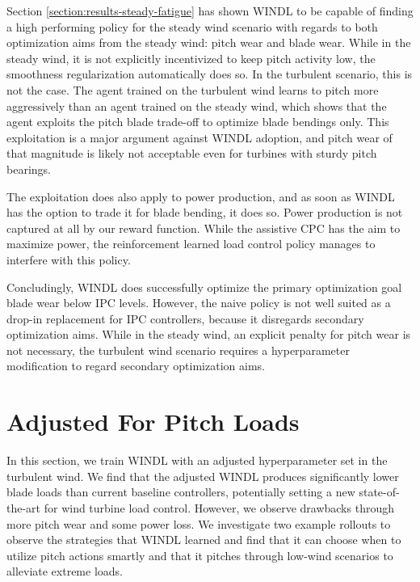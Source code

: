 Section \ref{section:results-steady-fatigue} has shown WINDL to be capable of finding a high performing policy for the steady wind scenario with regards to both optimization aims from the steady wind: pitch wear and blade wear. While in the steady wind, it is not explicitly incentivized to keep pitch activity low, the smoothness regularization automatically does so. In the turbulent scenario, this is not the case. The agent trained on the turbulent wind learns to pitch more aggressively than an agent trained on the steady wind, which shows that the agent exploits the pitch blade trade-off to optimize blade bendings only. This exploitation is a major argument against WINDL adoption, and pitch wear of that magnitude is likely not acceptable even for turbines with sturdy pitch bearings. 

The exploitation does also apply to power production, and as soon as WINDL has the option to trade it for blade bending, it does so. Power production is not captured at all by our reward function. While the assistive CPC has the aim to maximize power, the reinforcement learned load control policy manages to interfere with this policy.

Concludingly, WINDL does successfully optimize the primary optimization goal blade wear below IPC levels. However, the naive policy is not well suited as a drop-in replacement for IPC controllers, because it disregards secondary optimization aims. While in the steady wind, an explicit penalty for pitch wear is not necessary, the turbulent wind scenario requires a hyperparameter modification to regard secondary optimization aims.

\section{Adjusted For Pitch Loads}
\label{section:results-adjusted}

\begin{summary}
In this section, we train WINDL with an adjusted hyperparameter set in the turbulent wind. We find that the adjusted WINDL produces significantly lower blade loads than current baseline controllers, potentially setting a new state-of-the-art for wind turbine load control. However, we observe drawbacks through more pitch wear and some power loss. We investigate two example rollouts to observe the strategies that WINDL learned and find that it can choose when to utilize pitch actions smartly and that it pitches through low-wind scenarios to alleviate extreme loads.
\end{summary}

